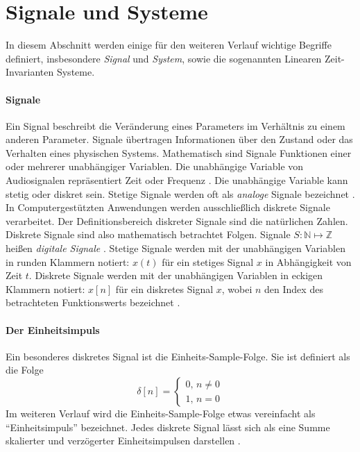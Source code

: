 \section{Signale und Systeme}
\label{sec:signals_and_systems}
In diesem Abschnitt werden einige für den weiteren Verlauf wichtige Begriffe definiert, insbesondere \textit{Signal} und \textit{System},
sowie die sogenannten Linearen Zeit-Invarianten Systeme.
\paragraph{Signale}
Ein Signal beschreibt die Veränderung eines Parameters im Verhältnis zu einem anderen Parameter.
Signale übertragen Informationen über den Zustand oder das Verhalten eines physischen Systems. Mathematisch sind Signale
Funktionen einer oder mehrerer unabhängiger Variablen. Die unabhängige Variable von Audiosignalen repräsentiert Zeit oder Frequenz \cite[Kap. 5]{smith1997}.
Die unabhängige Variable kann stetig
oder diskret sein. Stetige Signale werden oft als \textit{analoge} Signale bezeichnet \cite[Kap. 2]{oppenheim1999}. In Computergestützten Anwendungen werden 
ausschließlich diskrete Signale verarbeitet.
Der Definitionsbereich diskreter Signale sind die natürlichen Zahlen. Diskrete Signale sind also mathematisch betrachtet Folgen. 
Signale $S:\mathbb{N}\mapsto\mathbb{Z}$ heißen \textit{digitale Signale} \cite[Kap. 2]{oppenheim1999}.
Stetige Signale werden mit der unabhängigen Variablen in runden Klammern notiert:
$x(t)$ für ein stetiges Signal $x$ in Abhängigkeit von Zeit $t$.
Diskrete Signale werden mit der unabhängigen Variablen in eckigen Klammern notiert: $x[n]$ für ein diskretes Signal $x$,
wobei $n$ den Index des betrachteten Funktionswerts bezeichnet \cite[S. 9]{oppenheim1999}.
\paragraph{Der Einheitsimpuls}
Ein besonderes diskretes Signal ist die Einheits-Sample-Folge.
Sie ist definiert als die Folge
\begin{equation}
    \delta[n]=
    \begin{cases}
        0,\,n\ne0\\
        1,\,n=0
    \end{cases}
\end{equation}
Im weiteren Verlauf wird die Einheits-Sample-Folge etwas vereinfacht als ``Einheitsimpuls'' bezeichnet.
Jedes diskrete Signal lässt sich als eine Summe skalierter und verzögerter Einheitsimpulsen darstellen \cite[S. 11]{oppenheim1999}.
